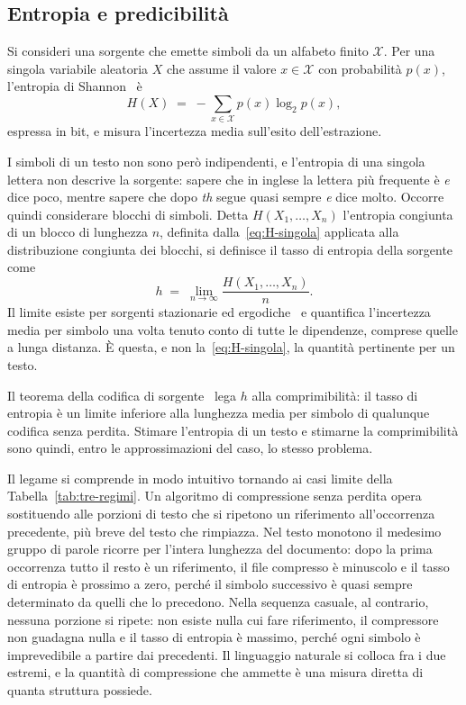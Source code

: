 \subsection{Entropia e predicibilità}
\label{sec:entropia-def}

Si consideri una sorgente che emette simboli da un alfabeto finito
$\mathcal{X}$. Per una singola variabile aleatoria $X$ che assume il valore
$x \in \mathcal{X}$ con probabilità $p(x)$, l'entropia di
Shannon~\cite{shannon1948} è
\begin{equation}
  H(X) \;=\; -\sum_{x \in \mathcal{X}} p(x) \log_2 p(x),
  \label{eq:H-singola}
\end{equation}
espressa in bit, e misura l'incertezza media sull'esito dell'estrazione.

I simboli di un testo non sono però indipendenti, e l'entropia di una singola
lettera non descrive la sorgente: sapere che in inglese la lettera più frequente
è \emph{e} dice poco, mentre sapere che dopo \emph{th} segue quasi sempre
\emph{e} dice molto. Occorre quindi considerare blocchi di simboli. Detta
$H(X_1,\dots,X_n)$ l'entropia congiunta di un blocco di lunghezza $n$, definita
dalla~\eqref{eq:H-singola} applicata alla distribuzione congiunta dei blocchi, si
definisce il tasso di entropia della sorgente come
\begin{equation}
  h \;=\; \lim_{n\to\infty} \frac{H(X_1,\dots,X_n)}{n} .
  \label{eq:tasso-entropia}
\end{equation}
Il limite esiste per sorgenti stazionarie ed ergodiche~\cite{cover2006} e
quantifica l'incertezza media per simbolo una volta tenuto conto di tutte le
dipendenze, comprese quelle a lunga distanza. È questa, e non
la~\eqref{eq:H-singola}, la quantità pertinente per un testo.

Il teorema della codifica di sorgente~\cite{cover2006} lega $h$ alla
comprimibilità: il tasso di entropia è un limite inferiore alla lunghezza media
per simbolo di qualunque codifica senza perdita. Stimare l'entropia di un testo
e stimarne la comprimibilità sono quindi, entro le approssimazioni del caso, lo
stesso problema.

Il legame si comprende in modo intuitivo tornando ai casi limite della
Tabella~\ref{tab:tre-regimi}. Un algoritmo di compressione senza perdita opera
sostituendo alle porzioni di testo che si ripetono un riferimento
all'occorrenza precedente, più breve del testo che rimpiazza. Nel testo monotono
il medesimo gruppo di parole ricorre per l'intera lunghezza del documento: dopo
la prima occorrenza tutto il resto è un riferimento, il file compresso è
minuscolo e il tasso di entropia è prossimo a zero, perché il simbolo successivo
è quasi sempre determinato da quelli che lo precedono. Nella sequenza casuale,
al contrario, nessuna porzione si ripete: non esiste nulla cui fare riferimento,
il compressore non guadagna nulla e il tasso di entropia è massimo, perché ogni
simbolo è imprevedibile a partire dai precedenti. Il linguaggio naturale si
colloca fra i due estremi, e la quantità di compressione che ammette è una
misura diretta di quanta struttura possiede.

